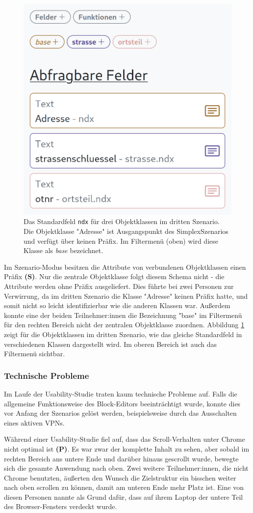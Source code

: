\begin{figure}[!ht]
  \centering
  \includegraphics[width=.5\textwidth]{assets/scenario-prefixes.png}
  \caption{Das Standardfeld \texttt{ndx} für drei Objektklassen im dritten Szenario. Die Objektklasse "Adresse" ist Ausgangspunkt des SimplexSzenarios und verfügt über keinen Präfix. Im Filtermenü (oben) wird diese Klasse als \textit{base} bezeichnet.}
  \label{fig:scenario-prefixes}
\end{figure}
Im Szenario-Modus besitzen die Attribute von verbundenen Objektklassen einen Präfix \textbf{(S)}. Nur die zentrale Objektklasse folgt diesem Schema nicht - die Attribute werden ohne Präfix ausgeliefert. Dies führte bei zwei Personen zur Verwirrung, da im dritten Szenario die Klasse "Adresse" keinen Präfix hatte, und somit nicht so leicht identifizierbar wie die anderen Klassen war. Außerdem konnte eine der beiden Teilnehmer:innen die Bezeichnung "base" im Filtermenü für den rechten Bereich nicht der zentralen Objektklasse zuordnen. Abbildung \ref{fig:scenario-prefixes} zeigt für die Objektklassen im dritten Szenario, wie das gleiche Standardfeld in verschiedenen Klassen dargestellt wird. Im oberen Bereich ist auch das Filtermenü sichtbar.

\subsubsection{Technische Probleme}
Im Laufe der Usability-Studie traten kaum technische Probleme auf. Falls die allgemeine Funktionsweise des Block-Editors beeinträchtigt wurde, konnte dies vor Anfang der Szenarios gelöst werden, beispielsweise durch das Ausschalten eines aktiven \acs{VPN}s.

Während einer Usability-Studie fiel auf, dass das Scroll-Verhalten unter Chrome nicht optimal ist \textbf{(P)}. Es war zwar der komplette Inhalt zu sehen, aber sobald im rechten Bereich ans untere Ende und darüber hinaus gescrollt wurde, bewegte sich die gesamte Anwendung nach oben. Zwei weitere Teilnehmer:innen, die nicht Chrome benutzten, äußerten den Wunsch die Zielstruktur ein bisschen weiter nach oben scrollen zu können, damit am unteren Ende mehr Platz ist. Eine von diesen Personen nannte als Grund dafür, dass auf ihrem Laptop der untere Teil des Browser-Fensters verdeckt wurde.
